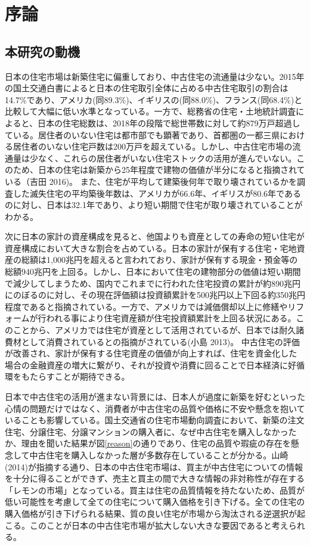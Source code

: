 \documentclass[a4paper,fontsize=11pt,report,notitlepage,line_length=38zw,number_of_lines=40,dvipdfmx]{jlreq}
\begin{document}
\newpage
\tableofcontents

\newpage
\chapter{序論}
\section{本研究の動機}
日本の住宅市場は新築住宅に偏重しており、中古住宅の流通量は少ない。2015年の国土交通白書によると日本の住宅取引全体に占める中古住宅取引の割合は14.7\%であり、アメリカ(同89.3\%)、イギリスの(同88.0\%)、フランス(同68.4\%)と比較して大幅に低い水準となっている\cite{hakusho}。一方で、総務省の住宅・土地統計調査によると、日本の住宅総数は、2018年の段階で総世帯数に対して約879万戸超過している。居住者のいない住宅は都市部でも顕著であり、首都圏の一都三県における居住者のいない住宅戸数は200万戸を超えている。しかし、中古住宅市場の流通量は少なく、これらの居住者がいない住宅ストックの活用が進んでいない。このため、日本の住宅は新築から25年程度で建物の価値が半分になると指摘されている（吉田 2016)\cite{yoshida2016}。
また、住宅が平均して建築後何年で取り壊されているかを調査した滅失住宅の平均築後年数は、アメリカが66.6年、イギリスが80.6年であるのに対し、日本は32.1年であり、より短い期間で住宅が取り壊されていることがわかる\cite{kizonjutaku}。

次に日本の家計の資産構成を見ると、他国よりも資産としての寿命の短い住宅が資産構成において大きな割合を占めている。日本の家計が保有する住宅・宅地資産の総額は1,000兆円を超えると言われており、家計が保有する現金・預金等の総額940兆円を上回る。しかし、日本において住宅の建物部分の価値は短い期間で減少してしまうため、国内でこれまでに行われた住宅投資の累計が約890兆円にのぼるのに対し、その現在評価額は投資額累計を500兆円以上下回る約350兆円程度であると指摘されている\cite{roundtable}。一方で、アメリカでは減価償却以上に修繕やリフォームが行われる事により住宅資産額が住宅投資額累計を上回る状況にある。このことから、アメリカでは住宅が資産として活用されているが、日本では耐久諸費材として消費されているとの指摘がされている(小島 2013)\cite{kojima2013}。
中古住宅の評価が改善され、家計が保有する住宅資産の価値が向上すれば、住宅を資金化した場合の金融資産の増大に繋がり、それが投資や消費に回ることで日本経済に好循環をもたらすことが期待できる。

日本で中古住宅の活用が進まない背景には、日本人が過度に新築を好むといった心情の問題だけではなく、消費者が中古住宅の品質や価格に不安や懸念を抱いていることも影響している。国土交通省の住宅市場動向調査において、新築の注文住宅、分譲住宅、分譲マンションの購入者に、なぜ中古住宅を購入しなかったか、理由を聞いた結果が図\ref{reason}の通りであり、住宅の品質や瑕疵の存在を懸念して中古住宅を購入しなかった層が多数存在していることが分かる。山崎(2014)\cite{yamasaki2014}が指摘する通り、日本の中古住宅市場は、買主が中古住宅についての情報を十分に得ることができず、売主と買主の間で大きな情報の非対称性が存在する「レモンの市場」となっている。買主は住宅の品質情報を持たないため、品質が低い可能性を考慮して全ての住宅について購入価格を引き下げる。全ての住宅の購入価格が引き下げられる結果、質の良い住宅が市場から淘汰される逆選択が起こる。このことが日本の中古住宅市場が拡大しない大きな要因であると考えられる。
\end{document}
